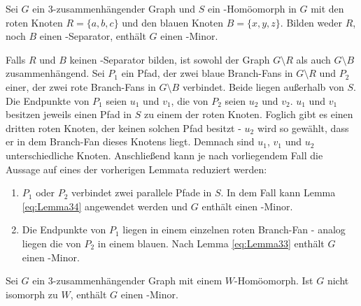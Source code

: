 \begin{lemma}\label{eq:Lemma35}
  Sei $G$ ein $3$-zusammenhängender Graph und $S$ ein \kdd-Homöomorph in $G$ mit den roten Knoten $R = \{a, b, c\}$ und den blauen Knoten $B = \{x, y, z\}$.
  Bilden weder $R$, noch $B$ einen \dd-Separator, enthält $G$ einen \kf-Minor.
\end{lemma}
\begin{beweis}
  Falls $R$ und $B$ keinen \dd-Separator bilden, ist sowohl der Graph $G \setminus R$ als auch $G \setminus B$ zusammenhängend.
  Sei $P_1$ ein Pfad, der zwei blaue Branch-Fans in $G \setminus R$ und $P_2$ einer, der zwei rote Branch-Fans in $G \setminus B$ verbindet.
  Beide liegen außerhalb von $S$.
  Die Endpunkte von $P_1$ seien $u_1$ und $v_1$, die von $P_2$ seien $u_2$ und $v_2$.
  $u_1$ und $v_1$ besitzen jeweils einen Pfad in $S$ zu einem der roten Knoten.
  Foglich gibt es einen dritten roten Knoten, der keinen solchen Pfad besitzt - $u_2$ wird so gewählt, dass er in dem Branch-Fan dieses Knotens liegt.
  Demnach sind $u_1$, $v_1$ und $u_2$ unterschiedliche Knoten.
  Anschließend kann je nach vorliegendem Fall die Aussage auf eines der vorherigen Lemmata reduziert werden:
  \begin{enumerate}
    \item $P_1$ oder $P_2$ verbindet zwei parallele Pfade in $S$.
          In dem Fall kann Lemma \ref{eq:Lemma34} angewendet werden und $G$ enthält einen \kf-Minor.
    \item Die Endpunkte von $P_1$ liegen in einem einzelnen roten Branch-Fan - analog liegen die von $P_2$ in einem blauen.
          Nach Lemma \ref{eq:Lemma33} enthält $G$ einen \kf-Minor.
  \end{enumerate}
\end{beweis}

\begin{lemma}\label{eq:Lemma36}
  Sei $G$ ein $3$-zusammenhängender Graph mit einem $W$-Homöomorph.
  Ist $G$ nicht isomorph zu $W$, enthält $G$ einen \kf-Minor.
\end{lemma}

